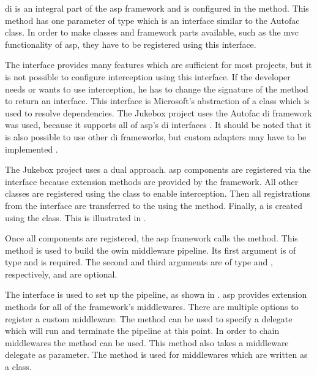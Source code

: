 \gls{di} is an integral part of the \gls{asp} framework and is configured in the  method. This method has one parameter of type  which is an interface similar to the Autofac  class. In order to make classes and framework parts available, such as the \gls{mvc} functionality of \gls{asp}, they have to be registered using this interface.

The  interface provides many features which are sufficient for most projects, but it is not possible to configure interception using this interface. If the developer needs or wants to use interception, he has to change the signature of the  method to return an  interface. This interface is Microsoft's abstraction of a  class which is used to resolve dependencies. The Jukebox project uses the Autofac \gls{di} framework was used, because it supports all of \gls{asp}'s \gls{di} interfaces \cite{autofacCoreDoc}. It should be noted that it is also possible to use other \gls{di} frameworks, but custom adapters may have to be implemented \cite{aspCustomDI}.

The Jukebox project uses a dual approach. \gls{asp} components are registered via the  interface because extension methods are provided by the framework. All other classes are registered using the  class to enable interception. Then all registrations from the  interface are transferred to the  using the  method. Finally, a  is created using the   class. This is illustrated in .


Once all components are registered, the \gls{asp} framework calls the  method. This method is used to build the \gls{owin} middleware pipeline. Its first argument is of type  and is required. The second and third arguments are of type  and , respectively, and are optional.

The  interface is used to set up the pipeline, as shown in . \gls{asp} provides extension methods for all of the framework's middlewares. There are multiple options to register a custom middleware. The  method can be used to specify a delegate which will run and terminate the pipeline at this point. In order to chain middlewares the  method can be used. This method also takes a middleware delegate as parameter. The  method is used for middlewares which are written as a class. \cite{aspMiddleware}

